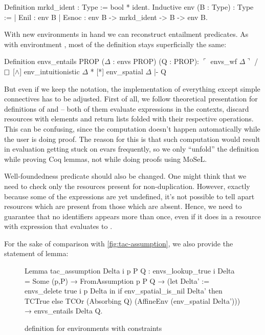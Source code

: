 \begin{coq}
  Definition mrkd_ident : Type := bool * ident.
  Inductive env (B : Type) : Type :=
  | Enil : env B
  | Esnoc : env B -> mrkd_ident -> B -> env B.
\end{coq}

With new environments in hand we can reconstruct entailment predicates.
As with environtment , most of the definition stays superficially the same:
\begin{coq}
  Definition envs_entails {PROP} ($\Delta$ : envs PROP) (Q : PROP):
  $\ulcorner$ envs_wf $\Delta \urcorner$ /\ $\mathop{\Box}$ [$\wedge$] env_intuitionistic $\Delta$ * [*] env_spatial $\Delta$ |- Q
\end{coq}

But even if we keep the notation, the implementation of everything except simple connectives has to be adjusted.
First of all, we follow theoretical presentation for definitions of \coqe{[$\wedge$]} and \coqe{[*]} -- both of them evaluate expressions in the contexts, discard resources with \false elements and return lists folded with their respective operations.
This can be confusing, since the computation doesn't happen automatically while the user is doing proof.
The reason for this is that such computation would result in evaluation getting stuck on evars frequently, so we only ``unfold'' the definition while proving Coq lemmas, not while doing proofs using MoSeL.

Well-foundedness predicate should also be changed.
One might think that we need to check only the resources present for non-duplication.
However, exactly because some of the expressions are yet undefined, it's not possible to tell apart resources which are present from those which are absent.
Hence, we need to guarantee that no identifiers appears more than once, even if it does in a resource with expression that evaluates to \false.

For the sake of comparison with \ref{fig:tac-assumption}, we also provide the statement of  lemma:

\begin{figure}[H]
  \begin{coq}
Lemma tac_assumption Delta i p P Q :
  envs_lookup_true i Delta = Some (p,P) →
  FromAssumption p P Q →
  (let Delta' := envs_delete true i p Delta in
   if env_spatial_is_nil Delta' then TCTrue
   else TCOr (Absorbing Q) (AffineEnv (env_spatial Delta'))) →
  envs_entails Delta Q.
  \end{coq}
  \caption{ definition for environments with constraints}
  \label{fig:tac-assumption-constr}
\end{figure}


